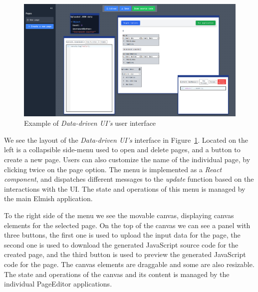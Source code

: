 \begin{figure}[H]
	\centering
	\includegraphics[width=1\linewidth]{img/UIExample.pdf}
	\caption{Example of \emph{Data-driven UI's} user interface}
	\label{fig:ui}
\end{figure}

We see the layout of the \emph{Data-driven UI's} interface in Figure~\ref{fig:ui}.
Located on the left is a collapsible side-menu used to open and delete pages, and a button to create a new page.
Users can also customize the name of the individual page, by clicking twice on the page option.
The menu is implemented as a \emph{React component}, and dispatches different messages to the \emph{update} function based on the interactions with the UI.
The state and operations of this menu is managed by the main Elmish application.

To the right side of the menu we see the movable canvas, displaying canvas elements for the selected page.
On the top of the canvas we can see a panel with three buttons, the first one is used to upload the input data for the page, the second one is used to download the generated JavaScript source code for the created page,
and the third button is used to preview the generated JavaScript code for the page.
The canvas elements are draggable and some are also resizable.
The state and operations of the canvas and its content is managed by the individual PageEditor applications.

